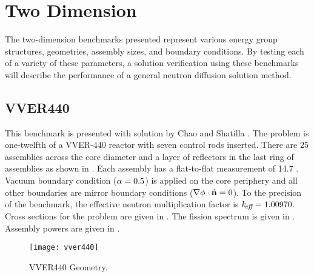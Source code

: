 \section{Two Dimension}
  The two-dimension benchmarks presented represent various energy group
  structures, geometries, assembly sizes, and boundary conditions. By testing
  each of a variety of these parameters, a solution verification using these
  benchmarks will describe the performance of a general neutron diffusion
  solution method.

  \subsection{VVER440}
    \label{sec:vver440}
    This benchmark is presented with solution by Chao and Shatilla
    \cite{chao}. The problem is
    one-twelfth of a VVER-440 reactor with seven control rods inserted. There
    are 25 assemblies across the core diameter and a layer of reflectors in the
    last ring of assemblies as shown in . Each assembly
    has a flat-to-flat measurement of 14.7 . Vacuum boundary
    condition ($\alpha = 0.5$) is applied on the core periphery and all other
    boundaries are mirror boundary conditions ($\mathbf{\nabla} \phi \cdot \hat{\mathbf{n}} = 0$). To 
    the precision of the benchmark, the effective neutron multiplication factor 
    is $k_{\!\mbox{\scriptsize \em eff}} = 1.00970$. Cross sections for the problem are given in
    . The fission spectrum is given in
    . Assembly powers are given in .

    \begin{figure}
      \centering
      \texttt{[image: vver440]}
      \caption{VVER440 Geometry.}
      \label{fig:vver440_geom}
    \end{figure}

